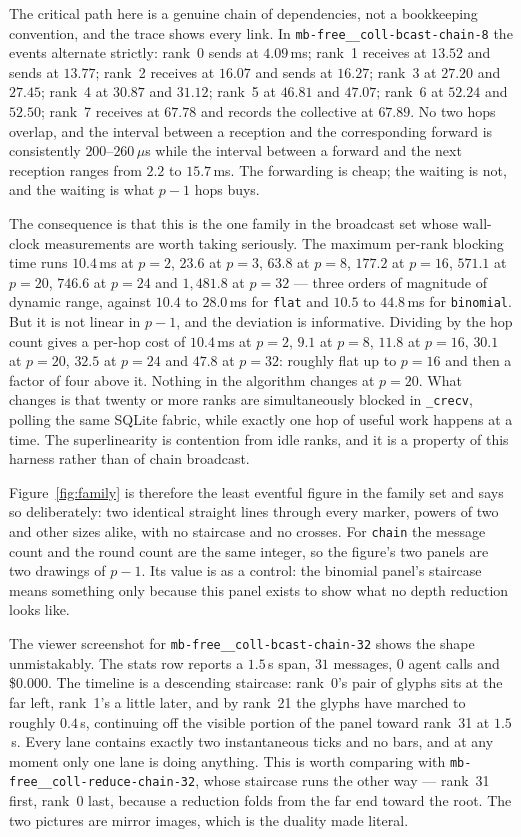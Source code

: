\documentclass[11pt]{article}
\begin{document}
The critical path here is a genuine chain of dependencies, not a bookkeeping convention, and
the trace shows every link. In \texttt{mb-free\_\_coll-bcast-chain-8} the events alternate
strictly: rank~0 sends at $4.09$\,ms; rank~1 receives at $13.52$ and sends at $13.77$; rank~2
receives at $16.07$ and sends at $16.27$; rank~3 at $27.20$ and $27.45$; rank~4 at $30.87$ and
$31.12$; rank~5 at $46.81$ and $47.07$; rank~6 at $52.24$ and $52.50$; rank~7 receives at
$67.78$ and records the collective at $67.89$. No two hops overlap, and the interval between a
reception and the corresponding forward is consistently $200$--$260\,\mu$s while the interval
between a forward and the next reception ranges from $2.2$ to $15.7$\,ms. The forwarding is
cheap; the waiting is not, and the waiting is what $p-1$ hops buys.

The consequence is that this is the one family in the broadcast set whose wall-clock
measurements are worth taking seriously. The maximum per-rank blocking time runs $10.4$\,ms at
$p=2$, $23.6$ at $p=3$, $63.8$ at $p=8$, $177.2$ at $p=16$, $571.1$ at $p=20$, $746.6$ at
$p=24$ and $1{,}481.8$ at $p=32$ --- three orders of magnitude of dynamic range, against
$10.4$ to $28.0$\,ms for \texttt{flat} and $10.5$ to $44.8$\,ms for \texttt{binomial}. But it
is not linear in $p-1$, and the deviation is informative. Dividing by the hop count gives a
per-hop cost of $10.4$\,ms at $p=2$, $9.1$ at $p=8$, $11.8$ at $p=16$, $30.1$ at $p=20$,
$32.5$ at $p=24$ and $47.8$ at $p=32$: roughly flat up to $p=16$ and then a factor of four
above it. Nothing in the algorithm changes at $p=20$. What changes is that twenty or more
ranks are simultaneously blocked in \texttt{\_crecv}, polling the same SQLite fabric, while
exactly one hop of useful work happens at a time. The superlinearity is contention from idle
ranks, and it is a property of this harness rather than of chain broadcast.

Figure~\ref{fig:family} is therefore the least eventful figure in the family set and says so
deliberately: two identical straight lines through every marker, powers of two and other sizes
alike, with no staircase and no crosses. For \texttt{chain} the message count and the round
count are the same integer, so the figure's two panels are two drawings of $p-1$. Its value is
as a control: the binomial panel's staircase means something only because this panel exists to
show what no depth reduction looks like.

The viewer screenshot for \texttt{mb-free\_\_coll-bcast-chain-32} shows the shape unmistakably.
The stats row reports a $1.5$\,s span, $31$ messages, $0$ agent calls and \$0.000. The
timeline is a descending staircase: rank~0's pair of glyphs sits at the far left, rank~1's a
little later, and by rank~21 the glyphs have marched to roughly $0.4$\,s, continuing off the
visible portion of the panel toward rank~31 at $1.5$\,s. Every lane contains exactly two
instantaneous ticks and no bars, and at any moment only one lane is doing anything. This is
worth comparing with \texttt{mb-free\_\_coll-reduce-chain-32}, whose staircase runs the other
way --- rank~31 first, rank~0 last, because a reduction folds from the far end toward the root.
The two pictures are mirror images, which is the duality made literal.
\end{document}

